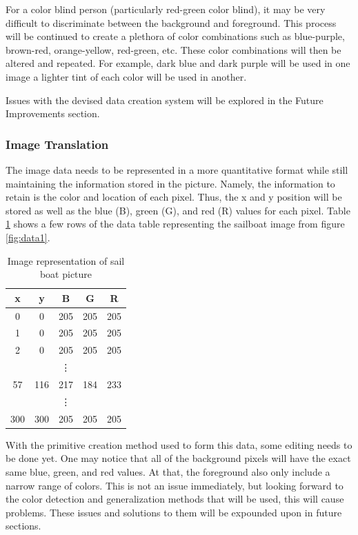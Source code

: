 \documentclass[12pt]{article}
\begin{document}
For a color blind person (particularly red-green color blind), it may be very difficult to discriminate between the background and foreground. This process will be continued to create a plethora of color combinations such as blue-purple, brown-red, orange-yellow, red-green, etc. These color combinations will then be altered and repeated. For example, dark blue and dark purple will be used in one image a lighter tint of each color will be used in another.

Issues with the devised data creation system will be explored in the Future Improvements section.

\subsubsection{Image Translation}
The image data needs to be represented in a more quantitative format while still maintaining the information stored in the picture. Namely, the information to retain is the color and location of each pixel. Thus, the x and y position will be stored as well as the blue (B), green (G), and red (R) values for each pixel. Table \ref{table:1} shows a few rows of the data table representing the sailboat image from figure \ref{fig:data1}. 

\begin{table}[H]
	\centering
	\begin{tabular}{ c c c c c}
		x & y & B & G & R \\\hline 
		0 & 0 & 205 & 205 & 205 \\  
		1 & 0 & 205 & 205 & 205 \\
		2 & 0 & 205 & 205 & 205 \\    
		&  & \vdots &  &  \\ 
		57 & 116 & 217 & 184 &233\\
		&  & \vdots &  &  \\ 
		300 & 300 & 205 & 205 & 205 \\		
	\end{tabular}
	\caption{Image representation of sail boat picture}
	\label{table:1}
\end{table}

With the primitive creation method used to form this data, some editing needs to be done yet. One may notice that all of the background pixels will have the exact same blue, green, and red values. At that, the foreground also only include a narrow range of colors. This is not an issue immediately, but looking forward to the color detection and generalization methods that will be used, this will cause problems. These issues and solutions to them will be expounded upon in future sections.
\end{document}
